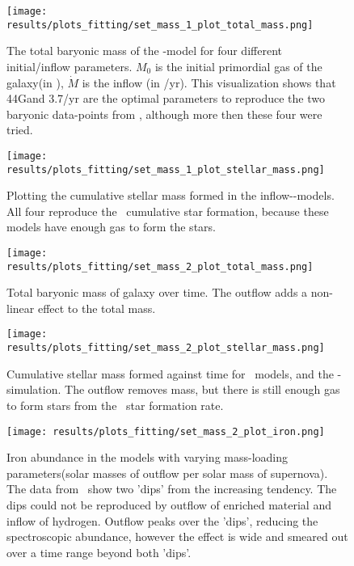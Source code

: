 \begin{figure}[h]
  \centering
  \texttt{[image: results/plots\_fitting/set\_mass\_1\_plot\_total\_mass.png]}
  \caption[]{\label{fig:fit-v1-1-total}
    The total baryonic mass of the \omegamodel-model for four different initial/inflow parameters.
    $M_0$ is the initial primordial gas of the galaxy(in \msol), $\dot{M}$ is the inflow (in \msol/yr).
    This visualization shows that 44G\msol and 3.7\msol/yr are the optimal parameters to reproduce the two baryonic data-points from \eris, although more then these four were tried.
  }
\end{figure}
\begin{figure}[h]
  \centering
  \texttt{[image: results/plots\_fitting/set\_mass\_1\_plot\_stellar\_mass.png]}
  \caption[]{\label{fig:fit-v1-1-stellar}
    Plotting the cumulative stellar mass formed in the inflow-\omegamodel-models. All four reproduce the \eris\ cumulative star formation, because these models have enough gas to form the stars.
  }
\end{figure}
\begin{figure}[h]
  \centering
  \texttt{[image: results/plots\_fitting/set\_mass\_2\_plot\_total\_mass.png]}
  \caption[]{\label{fig:fit-v1-2-total}
    Total baryonic mass of galaxy over time.
    The outflow adds a non-linear effect to the total mass.
  }
\end{figure}
\begin{figure}[h]
  \centering
  \texttt{[image: results/plots\_fitting/set\_mass\_2\_plot\_stellar\_mass.png]}
  \caption[]{\label{fig:fit-v1-2-stellar}
    Cumulative stellar mass formed against time for  \omegamodel\ models, and the \eris-simulation.
    The outflow removes mass, but there is still enough gas to form stars from the \eris\ star formation rate.
  }
\end{figure}
\begin{figure}[h]
  \centering
  \texttt{[image: results/plots\_fitting/set\_mass\_2\_plot\_iron.png]}
  \caption[]{\label{fig:fit-v1-2-iron}
    Iron abundance in the models with varying mass-loading parameters(solar masses of outflow per solar mass of supernova). The data from \eris\ show two 'dips' from the increasing tendency.
    The dips could not be reproduced by outflow of enriched material and inflow of hydrogen. Outflow peaks over the 'dips', reducing the spectroscopic abundance, however the effect is wide and smeared out over a time range beyond both 'dips'.
  }
\end{figure}
